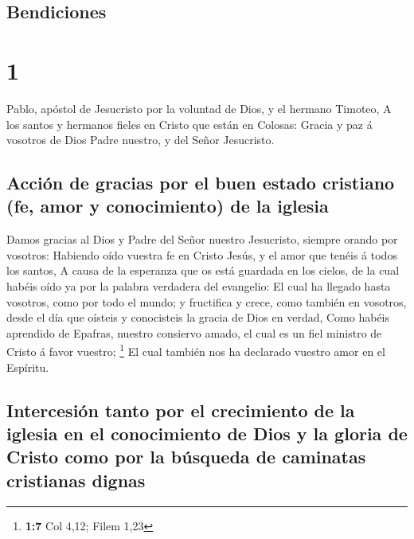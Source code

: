 \hypertarget{bendiciones}{%
\subsection{Bendiciones}\label{bendiciones}}

\hypertarget{section}{%
\section{1}\label{section}}

 Pablo, apóstol de Jesucristo por la voluntad de Dios, y
el hermano Timoteo,  A los santos y hermanos fieles en
Cristo que están en Colosas: Gracia y paz á vosotros de Dios Padre
nuestro, y del Señor Jesucristo.

\hypertarget{acciuxf3n-de-gracias-por-el-buen-estado-cristiano-fe-amor-y-conocimiento-de-la-iglesia}{%
\subsection{Acción de gracias por el buen estado cristiano (fe, amor y
conocimiento) de la
iglesia}\label{acciuxf3n-de-gracias-por-el-buen-estado-cristiano-fe-amor-y-conocimiento-de-la-iglesia}}

 Damos gracias al Dios y Padre del Señor nuestro
Jesucristo, siempre orando por vosotros:  Habiendo oído
vuestra fe en Cristo Jesús, y el amor que tenéis á todos los santos,
 A causa de la esperanza que os está guardada en los
cielos, de la cual habéis oído ya por la palabra verdadera del
evangelio:  El cual ha llegado hasta vosotros, como por
todo el mundo; y fructifica y crece, como también en vosotros, desde el
día que oísteis y conocisteis la gracia de Dios en verdad,
 Como habéis aprendido de Epafras, nuestro consiervo
amado, el cual es un fiel ministro de Cristo á favor vuestro;
\footnote{\textbf{1:7} Col 4,12; Filem 1,23}  El cual
también nos ha declarado vuestro amor en el Espíritu.

\hypertarget{intercesiuxf3n-tanto-por-el-crecimiento-de-la-iglesia-en-el-conocimiento-de-dios-y-la-gloria-de-cristo-como-por-la-buxfasqueda-de-caminatas-cristianas-dignas}{%
\subsection{Intercesión tanto por el crecimiento de la iglesia en el
conocimiento de Dios y la gloria de Cristo como por la búsqueda de
caminatas cristianas
dignas}\label{intercesiuxf3n-tanto-por-el-crecimiento-de-la-iglesia-en-el-conocimiento-de-dios-y-la-gloria-de-cristo-como-por-la-buxfasqueda-de-caminatas-cristianas-dignas}}

